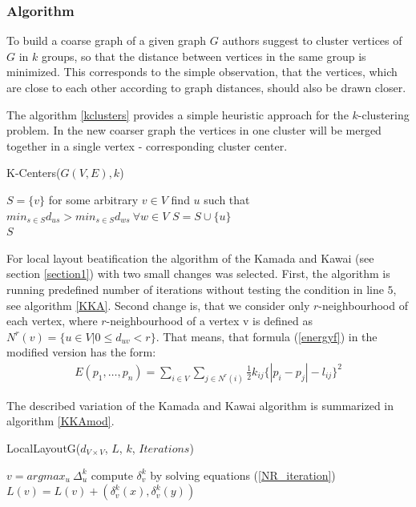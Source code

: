 \documentclass[12pt,a4paper]{article}
\begin{document}
\subsubsection*{Algorithm}
To build a coarse graph of a given graph $G$ authors suggest to cluster vertices of $G$ in $k$ groups, so that the distance between vertices in the same group is minimized. This corresponds to the simple observation, that the vertices, which are close to each other according to graph distances, should also be drawn closer.

The algorithm \ref{kclusters} provides a simple heuristic approach for the $k$-clustering problem. In the new coarser graph the vertices in one cluster will be merged together in a single vertex - corresponding cluster center.

\begin{algorithm}
\caption{K-Centers($G(V,E),k$) \cite{DavidHarel2002}}
\label{kclusters}
\begin{algorithmic}[1]
\State $S=\{v\}$ for some arbitrary $v\in V$
	\State find $u$ such that $min_{s\in S}d_{us}>min_{s\in S} d_{ws}\ \forall w\in V$ 
	\State $S = S\cup\{u\}$
\EndFor \\
\Return $S$
\end{algorithmic}
\end{algorithm}

For local layout beatification the algorithm of the Kamada and Kawai (see section \ref{section1}) with two small changes was selected. First, the algorithm is running predefined number of iterations without testing the condition in line $5$, see algorithm \ref{KKA}. Second change is, that we consider only $r$-neighbourhood of each vertex, where $r$-neighbourhood of a vertex v is defined as $N^r(v)=\{u\in V| 0\le d_{uv}<r\}$. That means, that formula (\ref{energyf}) in the modified version has the form:
\begin{align}
\label{energyf_HK}
E(p_1 , \dots, p_n) = \sum_{i\in V} \sum_{j\in N^r(i)} \frac{1}{2} k_{ij} \lbrace | p_i - p_j | - l_{ij} \rbrace^2
\end{align}

The described variation of the Kamada and Kawai algorithm is summarized in algorithm \ref{KKAmod}.

\begin{algorithm}
\caption{LocalLayoutG($d_{V\times V}$, $L$, $k$, $Iterations$) \cite{DavidHarel2002}}
\label{KKAmod}
\begin{algorithmic}[1]
	\State $v = argmax_{u}\ \Delta^k_u$
	\State compute $\delta^k_v$ by solving equations (\ref{NR_iteration})
	\State $L(v)=L(v) + (\delta^k_v(x), \delta^k_v(y))$
\EndFor
\end{algorithmic}
\end{algorithm}
\end{document}

